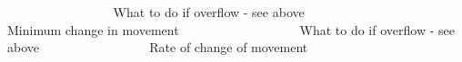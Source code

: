 ~\newline
~\newline
~\newline
~\newline
~\newline
~\newline
~\newline
~\newline
~\newline
~\newline
 What to do if overflow -\/ see above ~\newline
~\newline
~\newline
~\newline
~\newline
~\newline
~\newline
~\newline
~\newline
~\newline
~\newline
~\newline
 Minimum change in movement ~\newline
~\newline
~\newline
~\newline
~\newline
~\newline
~\newline
~\newline
~\newline
~\newline
~\newline
 What to do if overflow -\/ see above ~\newline
~\newline
~\newline
~\newline
~\newline
~\newline
~\newline
~\newline
~\newline
~\newline
 Rate of change of movement ~\newline
~\newline
~\newline
~\newline
~\newline
~\newline
~\newline
